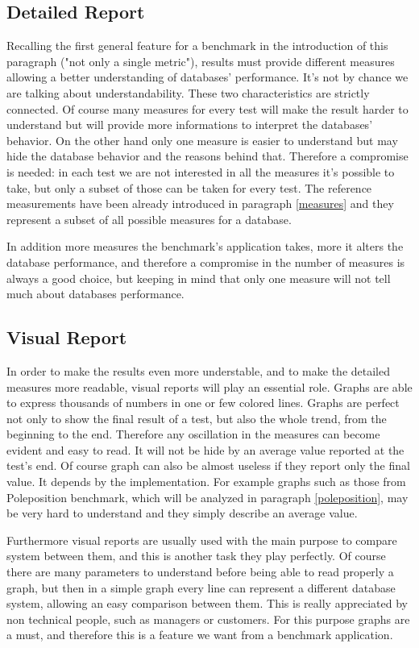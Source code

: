 		\subsection{Detailed Report}
Recalling the first general feature for a benchmark in the introduction of this paragraph ("not only a single metric"), results must provide different measures allowing a better understanding of databases' performance. It's not by chance we are talking about understandability. These two characteristics are strictly connected. Of course many measures for every test will make the result harder to understand but will provide more informations to interpret the databases' behavior. On the other hand only one measure is easier to understand but may hide the database behavior and the reasons behind that. Therefore a compromise is needed: in each test we are not interested in all the measures it's possible to take, but only a subset of those can be taken for every test. The reference measurements have been already introduced in paragraph \ref{measures} and they represent a subset of all possible measures for a database.

In addition more measures the benchmark's application takes, more it alters the database performance, and therefore a compromise in the number of measures is always a good choice, but keeping in mind that only one measure will not tell much about databases performance.

		\subsection{Visual Report}
In order to make the results even more understable, and to make the detailed measures more readable, visual reports will play an essential role. Graphs are able to express thousands of numbers in one or few colored lines. Graphs are perfect not only to show the final result of a test, but also the whole trend, from the beginning to the end. Therefore any oscillation in the measures can become evident and easy to read. It will not be hide by an average value reported at the test's end. Of course graph can also be almost useless if they report only the final value. It depends by the implementation. For example graphs such as those from Poleposition benchmark, which will be analyzed in paragraph \ref{poleposition}, may be very hard to understand and they simply describe an average value.

Furthermore visual reports are usually used with the main purpose to compare system between them, and this is another task they play perfectly. Of course there are many parameters to understand before being able to read properly a graph, but then in a simple graph every line can represent a different database system, allowing an easy comparison between them. This is really appreciated by non technical people, such as managers or customers. For this purpose graphs are a must, and therefore this is a feature we want from a benchmark application.

